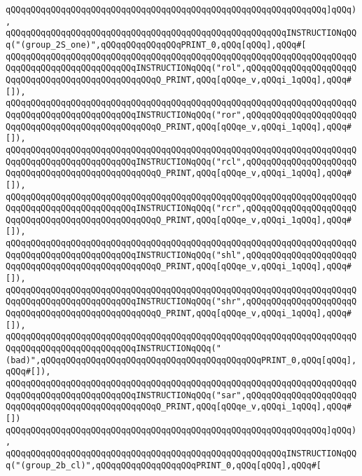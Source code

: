 \verb|qQQqqQQqqQQqqQQqqQQqqQQqqQQqqQQqqQQqqQQqqQQqqQQqqQQqqQQqqQQqqQQq]qQQq),|\newline
\verb|qQQqqQQqqQQqqQQqqQQqqQQqqQQqqQQqqQQqqQQqqQQqqQQqqQQqqQQqINSTRUCTIONqQQq("(group_2S_one)",qQQqqQQqqQQqqQQqPRINT_0,qQQq[qQQq],qQQq#[|\newline
\verb|qQQqqQQqqQQqqQQqqQQqqQQqqQQqqQQqqQQqqQQqqQQqqQQqqQQqqQQqqQQqqQQqqQQqqQQqqQQqqQQqqQQqqQQqqQQqqQQqINSTRUCTIONqQQq("rol",qQQqqQQqqQQqqQQqqQQqqQQqqQQqqQQqqQQqqQQqqQQqqQQqqQQqQ_PRINT,qQQq[qQQqe_v,qQQqi_1qQQq],qQQq#[]),|\newline
\verb|qQQqqQQqqQQqqQQqqQQqqQQqqQQqqQQqqQQqqQQqqQQqqQQqqQQqqQQqqQQqqQQqqQQqqQQqqQQqqQQqqQQqqQQqqQQqqQQqINSTRUCTIONqQQq("ror",qQQqqQQqqQQqqQQqqQQqqQQqqQQqqQQqqQQqqQQqqQQqqQQqqQQqQ_PRINT,qQQq[qQQqe_v,qQQqi_1qQQq],qQQq#[]),|\newline
\verb|qQQqqQQqqQQqqQQqqQQqqQQqqQQqqQQqqQQqqQQqqQQqqQQqqQQqqQQqqQQqqQQqqQQqqQQqqQQqqQQqqQQqqQQqqQQqqQQqINSTRUCTIONqQQq("rcl",qQQqqQQqqQQqqQQqqQQqqQQqqQQqqQQqqQQqqQQqqQQqqQQqqQQqQ_PRINT,qQQq[qQQqe_v,qQQqi_1qQQq],qQQq#[]),|\newline
\verb|qQQqqQQqqQQqqQQqqQQqqQQqqQQqqQQqqQQqqQQqqQQqqQQqqQQqqQQqqQQqqQQqqQQqqQQqqQQqqQQqqQQqqQQqqQQqqQQqINSTRUCTIONqQQq("rcr",qQQqqQQqqQQqqQQqqQQqqQQqqQQqqQQqqQQqqQQqqQQqqQQqqQQqQ_PRINT,qQQq[qQQqe_v,qQQqi_1qQQq],qQQq#[]),|\newline
\verb|qQQqqQQqqQQqqQQqqQQqqQQqqQQqqQQqqQQqqQQqqQQqqQQqqQQqqQQqqQQqqQQqqQQqqQQqqQQqqQQqqQQqqQQqqQQqqQQqINSTRUCTIONqQQq("shl",qQQqqQQqqQQqqQQqqQQqqQQqqQQqqQQqqQQqqQQqqQQqqQQqqQQqQ_PRINT,qQQq[qQQqe_v,qQQqi_1qQQq],qQQq#[]),|\newline
\verb|qQQqqQQqqQQqqQQqqQQqqQQqqQQqqQQqqQQqqQQqqQQqqQQqqQQqqQQqqQQqqQQqqQQqqQQqqQQqqQQqqQQqqQQqqQQqqQQqINSTRUCTIONqQQq("shr",qQQqqQQqqQQqqQQqqQQqqQQqqQQqqQQqqQQqqQQqqQQqqQQqqQQqQ_PRINT,qQQq[qQQqe_v,qQQqi_1qQQq],qQQq#[]),|\newline
\verb|qQQqqQQqqQQqqQQqqQQqqQQqqQQqqQQqqQQqqQQqqQQqqQQqqQQqqQQqqQQqqQQqqQQqqQQqqQQqqQQqqQQqqQQqqQQqqQQqINSTRUCTIONqQQq("(bad)",qQQqqQQqqQQqqQQqqQQqqQQqqQQqqQQqqQQqqQQqqQQqPRINT_0,qQQq[qQQq],qQQq#[]),|\newline
\verb|qQQqqQQqqQQqqQQqqQQqqQQqqQQqqQQqqQQqqQQqqQQqqQQqqQQqqQQqqQQqqQQqqQQqqQQqqQQqqQQqqQQqqQQqqQQqqQQqINSTRUCTIONqQQq("sar",qQQqqQQqqQQqqQQqqQQqqQQqqQQqqQQqqQQqqQQqqQQqqQQqqQQqQ_PRINT,qQQq[qQQqe_v,qQQqi_1qQQq],qQQq#[])|\newline
\verb|qQQqqQQqqQQqqQQqqQQqqQQqqQQqqQQqqQQqqQQqqQQqqQQqqQQqqQQqqQQqqQQq]qQQq),|\newline
\verb|qQQqqQQqqQQqqQQqqQQqqQQqqQQqqQQqqQQqqQQqqQQqqQQqqQQqqQQqINSTRUCTIONqQQq("(group_2b_cl)",qQQqqQQqqQQqqQQqqQQqPRINT_0,qQQq[qQQq],qQQq#[|\newline
